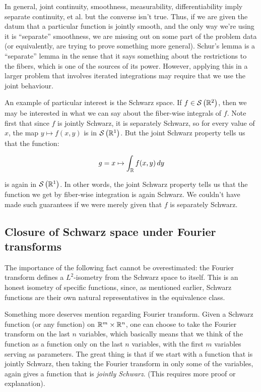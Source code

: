 \documentclass[a4paper]{amsart}
\newcommand{\schwarz}[1]{\mathcal{S}\left(#1\right)}
\begin{document}
In general, joint continuity, smoothness, measurability,
differentiability imply separate continuity, et al.  but the converse
isn't true. Thus, if we are given the datum that a particular function
is jointly smooth, and the only way we're using it is ``separate''
smoothness, we are missing out on some part of the problem data (or
equivalently, are trying to prove something more general). Schur's
lemma is a ``separate'' lemma in the sense that it says something
about the restrictions to the fibers, which is one of the sources of
its power. However, applying this in a larger problem that involves
iterated integrations may require that we use the joint behaviour.

An example of particular interest is the Schwarz space. If $f \in
\schwarz{\R^2}$, then we may be interested in what we can say about
the fiber-wise integrals of $f$. Note first that since $f$ is jointly
Schwarz, it is separately Schwarz, so for every value of $x$, the map
$y \mapsto f(x,y)$ is in $\schwarz{\R^1}$. But the joint Schwarz property
tells us that the function:

$$g = x \mapsto \int_{\mathbb{R}} f(x,y) \, dy $$

is again in $\schwarz{\R^1}$. In other words, the joint Schwarz
property tells us that the function we get by fiber-wise integration
is again Schwarz. We couldn't have made such guarantees if we were
merely given that $f$ is separately Schwarz.

\subsection{Closure of Schwarz space under Fourier transforms}

The importance of the following fact cannot be overestimated: the
Fourier transform defines a $L^2$-isometry from the Schwarz space to
itself. This is an honest isometry of specific functions, since, as
mentioned earlier, Schwarz functions are their own natural
representatives in the equivalence class.

Something more deserves mention regarding Fourier transform. Given a
Schwarz function (or any function) on $\mathbb{R}^m \times \mathbb{R}^n$, one can
choose to take the Fourier transform on the last $n$ variables, which
basically means that we think of the function as a function only on
the last $n$ variables, with the first $m$ variables serving as
parameters. The great thing is that if we start with a function that
is jointly Schwarz, then taking the Fourier transform in only some of
the variables, again gives a function that is {\em jointly
  Schwarz}. (This requires more proof or explanation).
\end{document}
